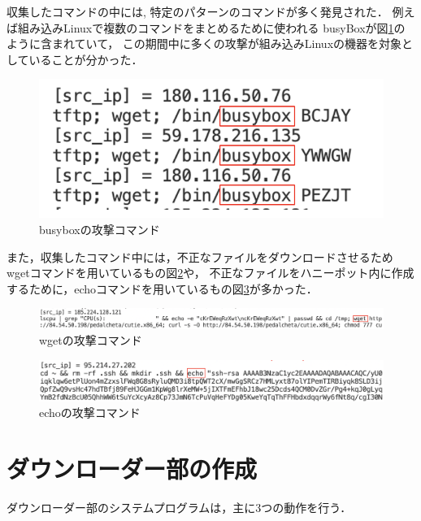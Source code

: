 \documentclass[dvipdfmx]{bta}
\begin{document}
収集したコマンドの中には,
特定のパターンのコマンドが多く発見された．
例えば組み込みLinuxで複数のコマンドをまとめるために使われる
busyBoxが図\ref{fig:busybox}のように含まれていて，
この期間中に多くの攻撃が組み込みLinuxの機器を対象としていることが分かった．

\begin{figure}[htbp]

	\centering
 	\includegraphics[scale=0.7]{busybox.png}
	\caption{busyboxの攻撃コマンド}\label{fig:busybox}
	
\end{figure}

また，収集したコマンド中には，不正なファイルをダウンロードさせるためwgetコマンドを用いているもの図\ref{fig:wget}や，
不正なファイルをハニーポット内に作成するために，echoコマンドを用いているもの図\ref{fig:echo}が多かった．
\begin{figure}[htbp]

	\centering
 	\includegraphics[scale=0.7]{wget.png}
	\caption{wgetの攻撃コマンド}\label{fig:wget}
	
\end{figure}

\begin{figure}[htbp]

	\centering
 	\includegraphics[scale=0.7]{echo.png}
	\caption{echoの攻撃コマンド}\label{fig:echo}
	
\end{figure}

\chapter{ダウンローダー部の作成}
ダウンローダー部のシステムプログラムは，主に3つの動作を行う．
\end{document}
